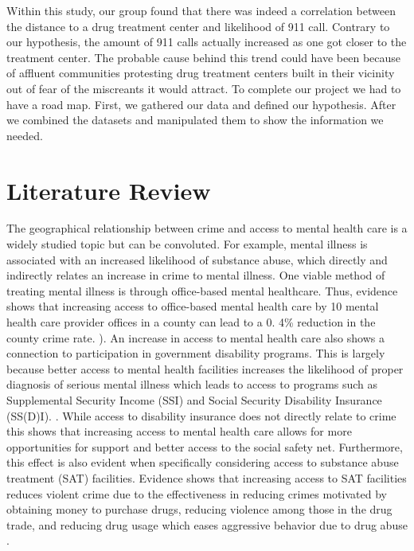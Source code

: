 \documentclass[12pt]{article}
\begin{document}
   Within this study, our group found that there was indeed a correlation between the distance to a drug treatment center and likelihood of 911 call. Contrary to our hypothesis, the amount of 911 calls actually increased as one got closer to the treatment center. The probable cause behind this trend could have been because of affluent communities protesting drug treatment centers built in their vicinity out of fear of the miscreants it would attract. To complete our project we had to have a road map. First, we gathered our data and defined our hypothesis. After we combined the datasets and manipulated them to show the information we needed.

\section{Literature Review} \label{sec:literature}
    The geographical relationship between crime and access to mental health care is a widely studied topic but can be convoluted. For example, mental illness is associated with an increased likelihood of substance abuse, which directly and indirectly relates an increase in crime to mental illness. One viable method of treating mental illness is through office-based mental healthcare. Thus, evidence shows that increasing access to office-based mental health care by 10 mental health care provider offices in a county can lead to a 0. 4\% reduction in the county crime rate. \cite{mental_healthcare_and_crime}). An increase in access to mental health care also shows a connection to participation in government disability programs. This is largely because better access to mental health facilities increases the likelihood of proper diagnosis of serious mental illness which leads to access to programs such as Supplemental Security Income (SSI) and Social Security Disability Insurance (SS(D)I). \cite{mental_health_and_disability}. While access to disability insurance does not directly relate to crime this shows that increasing access to mental health care allows for more opportunities for support and better access to the social safety net. Furthermore, this effect is also evident when specifically considering access to substance abuse treatment (SAT) facilities. Evidence shows that increasing access to SAT facilities reduces violent crime due to the effectiveness in reducing crimes motivated by obtaining money to purchase drugs, reducing violence among those in the drug trade, and reducing drug usage which eases aggressive behavior due to drug abuse \cite{SAT_centers_and_crime}. 
\end{document}
